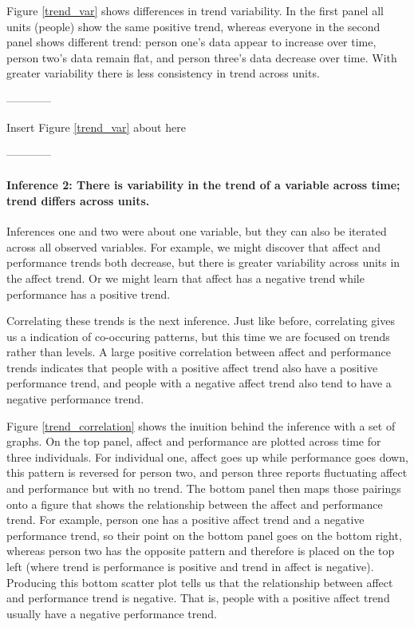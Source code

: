 \documentclass[english,,man]{apa6}
\let\oldparagraph\paragraph
\renewcommand{\paragraph}[1]{\oldparagraph{#1}\mbox{}}
\theoremstyle{definition}
\theoremstyle{definition}
\theoremstyle{definition}
\theoremstyle{remark}
\begin{document}
Figure \ref{trend_var} shows differences in trend variability. In the
first panel all units (people) show the same positive trend, whereas
everyone in the second panel shows different trend: person one's data
appear to increase over time, person two's data remain flat, and person
three's data decrease over time. With greater variability there is less
consistency in trend across units.

\begin{center}

------------

Insert Figure \ref{trend_var} about here

------------

\end{center}

\hypertarget{inference-2-there-is-variability-in-the-trend-of-a-variable-across-time-trend-differs-across-units.}{%
\paragraph{Inference 2: There is variability in the trend of a variable
across time; trend differs across
units.}\label{inference-2-there-is-variability-in-the-trend-of-a-variable-across-time-trend-differs-across-units.}}

Inferences one and two were about one variable, but they can also be
iterated across all observed variables. For example, we might discover
that affect and performance trends both decrease, but there is greater
variability across units in the affect trend. Or we might learn that
affect has a negative trend while performance has a positive trend.

Correlating these trends is the next inference. Just like before,
correlating gives us a indication of co-occuring patterns, but this time
we are focused on trends rather than levels. A large positive
correlation between affect and performance trends indicates that people
with a positive affect trend also have a positive performance trend, and
people with a negative affect trend also tend to have a negative
performance trend.

Figure \ref{trend_correlation} shows the inuition behind the inference
with a set of graphs. On the top panel, affect and performance are
plotted across time for three individuals. For individual one, affect
goes up while performance goes down, this pattern is reversed for person
two, and person three reports fluctuating affect and performance but
with no trend. The bottom panel then maps those pairings onto a figure
that shows the relationship between the affect and performance trend.
For example, person one has a positive affect trend and a negative
performance trend, so their point on the bottom panel goes on the bottom
right, whereas person two has the opposite pattern and therefore is
placed on the top left (where trend is performance is positive and trend
in affect is negative). Producing this bottom scatter plot tells us that
the relationship between affect and performance trend is negative. That
is, people with a positive affect trend usually have a negative
performance trend.
\end{document}
